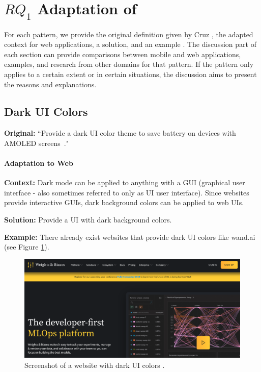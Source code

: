 \section{\texorpdfstring{$RQ_1$}: Adaptation of \EPS} 
%

%
%
%
%
%
%
%
%

For each pattern, we provide the original definition given by Cruz \etal, the adapted context for web applications, a solution, and an example \cite{cruz2019catalog}. The discussion part of each section can provide comparisons between mobile and web applications, examples, and research from other domains for that pattern. If the pattern only applies to a certain extent or in certain situations, the discussion aims to present the reasons and explanations.

\subsection{Dark UI Colors}\label{sec:patterns-DarkUIColors}
\textbf{Original:} {``}Provide a dark UI color theme to save battery on devices with AMOLED screens~\cite{cruz2019catalog}."

\paragraph{Adaptation to Web}\mbox{}

\textbf{Context:} Dark mode can be applied to anything with a GUI (graphical user interface - also sometimes referred to only as UI user interface). Since websites provide interactive GUIs, dark background colors can be applied to web UIs.

\textbf{Solution:} Provide a UI with dark background colors.

\textbf{Example:} There already exist websites that provide dark UI colors like wand.ai (see Figure \ref{fig:wandb}).
\begin{figure}
    \centering
    \includegraphics[width=\linewidth]{RQ1/Img/wandbAI.png}
    \caption{Screenshot of a website with dark UI colors \cite{website-wandb}.}
    \label{fig:wandb}
\end{figure}



